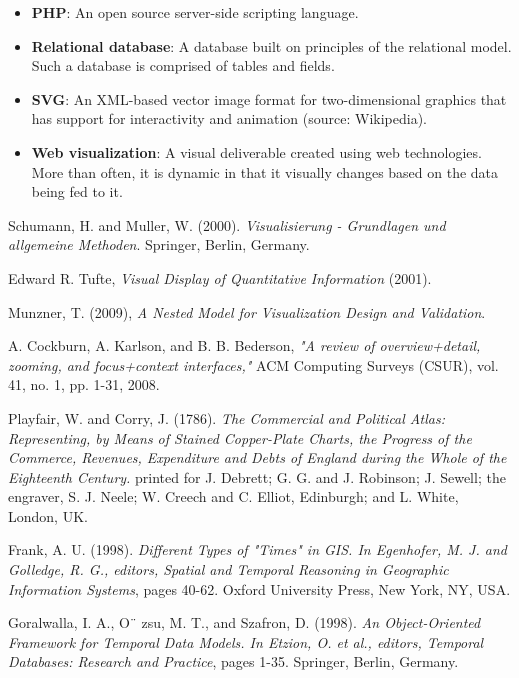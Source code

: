 \documentclass[12pt]{article}
\begin{document}
\begin{itemize}
\item[] \textbf{PHP}: An open source server-side scripting language.
\item[] \textbf{Relational database}: A database built on principles of the relational model. Such a database is comprised of tables and fields.
\item[] \textbf{SVG}: An XML-based vector image format for two-dimensional graphics that has support for interactivity and animation (source: Wikipedia).
\item[] \textbf{Web visualization}: A visual deliverable created using web technologies. More than often, it is dynamic in that it visually changes based on the data being fed to it. 
\end{itemize}

\vfill

\begin{thebibliography}{1}

   Schumann, H. and Muller, W. (2000). {\em Visualisierung - Grundlagen und allgemeine Methoden}. Springer, Berlin, Germany.

    Edward R. Tufte, {\em Visual Display of Quantitative Information} (2001).

   Munzner, T. (2009), {\em A Nested Model for Visualization Design and Validation}.

   A. Cockburn, A. Karlson, and B. B. Bederson, {\em "A review of overview+detail, zooming, and focus+context interfaces,"} ACM Computing Surveys (CSUR), vol. 41, no. 1, pp. 1-31, 2008.
  
   Playfair, W. and Corry, J. (1786). {\em The Commercial and Political Atlas: Representing, by Means of Stained Copper-Plate Charts, the Progress of the Commerce, Revenues, Expenditure and Debts of England during the Whole of the Eighteenth Century.} printed for J. Debrett; G. G. and J. Robinson; J. Sewell; the engraver, S. J. Neele; W. Creech and C. Elliot, Edinburgh; and L. White, London, UK.
  
   Frank, A. U. (1998). {\em Different Types of "Times" in GIS. In Egenhofer, M. J. and Golledge, R. G., editors, Spatial and Temporal Reasoning in Geographic Information Systems}, pages 40-62. Oxford University Press, New York, NY, USA.
  
   Goralwalla, I. A., O¨ zsu, M. T., and Szafron, D. (1998). {\em An Object-Oriented Framework for Temporal Data Models. In Etzion, O. et al., editors, Temporal Databases: Research and Practice}, pages 1-35. Springer, Berlin, Germany.
  

\end{thebibliography}
\end{document}
